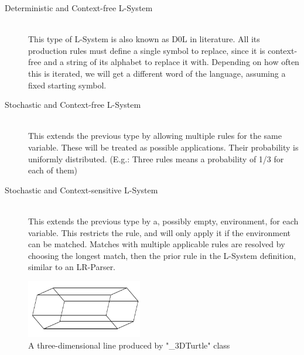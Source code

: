 \documentclass[11pt,a4paper]{article}
\begin{document}
\begin{description}

\item[Deterministic and Context-free L-System]\hfill \\
This type of L-System is also known as D0L in literature. All its production rules must define a single symbol to replace, since it is  context-free and a string of its alphabet to replace it with. Depending on how often this is iterated, we will get a different word of the language, assuming a fixed starting symbol. 
\item[Stochastic and Context-free L-System]\hfill \\
This extends the previous type by allowing multiple rules for the same variable. These will be treated as possible applications. Their probability is uniformly distributed. (E.g.: Three rules means a probability of 1/3 for each of them)
\item[Stochastic and Context-sensitive L-System]\hfill \\
This extends the previous type by a, possibly empty, environment, for each variable. This restricts the rule, and will only apply it if the environment can be matched. Matches with multiple applicable rules are resolved by choosing the longest match, then the prior rule in the L-System definition, similar to an LR-Parser.
\end{description}


\begin{figure}
  \begin{center}
    \includegraphics[width=0.45\textwidth]{images/line}
  \end{center} 
  \caption{A three-dimensional line produced by "\_3DTurtle" class}
  \label{fig:line}
\end{figure}
\end{document}
